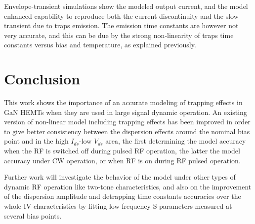 \documentclass[conference]{IEEEtran}
\begin{document}
Envelope-transient simulations show the modeled output current, and the model enhanced capability to reproduce both the current discontinuity and the slow transient due to traps emission. The emission time constants are however not very accurate, and this can be due by the strong non-linearity of traps time constants versus bias and temperature, as explained previously.



\section{Conclusion}
This work shows the importance of an accurate modeling of trapping effects in GaN HEMTs when they are used in large signal dynamic operation. An existing version of non-linear model including trapping effects has been improved in order to give better consistency between the dispersion effects around the nominal bias point and in the high $I_{ds}$-low $V_{ds}$ area, the first determining the model accuracy when the RF is switched off during pulsed RF operation, the latter the model accuracy under CW operation, or when RF is on during RF pulsed operation. 

Further work will investigate the behavior of the model under other types of dynamic RF operation like two-tone characteristics, and also on the improvement of the dispersion amplitude and detrapping time constants accuracies over the whole IV characteristics by fitting low frequency S-parameters measured at several bias points.








\end{document}
